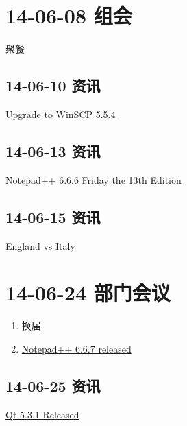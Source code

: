 \documentclass[]{report}
\begin{document}
\section{14-06-08 组会}
	聚餐~
	\subsection{14-06-10 资讯}
		\href{http://cdn.winscp.net/files/winscp554setup.exe}{Upgrade to WinSCP 5.5.4}
	\subsection{14-06-13 资讯}
		\href{http://notepad-plus-plus.org/zh/download/v6.6.6.html}{Notepad++ 6.6.6 Friday the 13th Edition}
	\subsection{14-06-15 资讯}
		England vs Italy
\section{14-06-24 部门会议}
\begin{enumerate}
	\item 换届
	\item \href{http://notepad-plus-plus.org/zh/download/v6.6.7.html}{Notepad++ 6.6.7 released}
\end{enumerate}
	\subsection{14-06-25 资讯}
		\href{http://blog.qt.digia.com/blog/2014/06/25/qt-5-3-1-released/}{Qt 5.3.1 Released}
\end{document}
